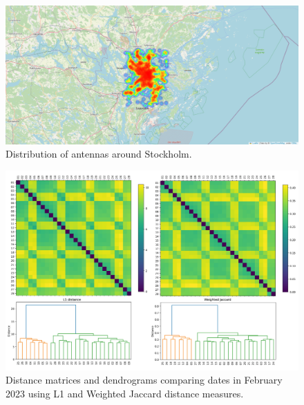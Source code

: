 \documentclass[../main.tex]{subfiles}
\begin{document}
\begin{figure}[ht]
\centering
\begin{adjustbox}{center}
\includegraphics[width=1.2\textwidth]{graphics/results/antenna_distribution.png}
\end{adjustbox}
\caption{Distribution of antennas around Stockholm.}
\label{fig:antenna_dist}
\end{figure}

\begin{figure}[ht]
\centering
\begin{adjustbox}{center}
\includegraphics[width=1.6\textwidth]{graphics/results/L1_Jaccard_Feb.png}
\end{adjustbox}
\caption{Distance matrices and dendrograms comparing dates in February 2023 using L1 and Weighted Jaccard distance measures.}
\label{fig:feb-dist-dend}
\end{figure}
\end{document}
